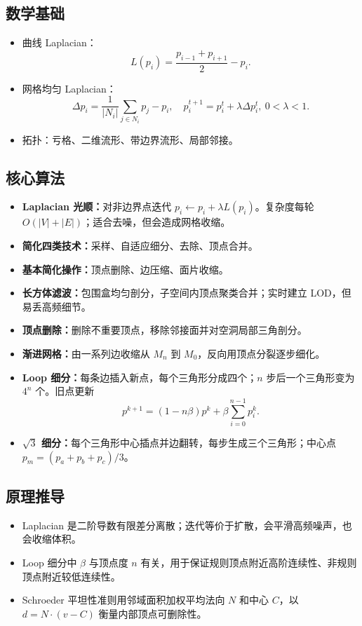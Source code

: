 \documentclass[UTF8,fontset=fandol,11pt]{ctexart}
\newcommand{\key}[1]{\textbf{#1}}
\begin{document}
\subsection{数学基础}
\begin{itemize}
  \item 曲线 Laplacian：
  \[
    L(p_i)=\frac{p_{i-1}+p_{i+1}}{2}-p_i.
  \]
  \item 网格均匀 Laplacian：
  \[
    \Delta p_i=\frac{1}{|N_i|}\sum_{j\in N_i}p_j-p_i,\quad
    p_i^{t+1}=p_i^t+\lambda\Delta p_i^t,\ 0<\lambda<1.
  \]
  \item 拓扑：亏格、二维流形、带边界流形、局部邻接。
\end{itemize}
\subsection{核心算法}
\begin{itemize}
  \item \key{Laplacian 光顺：}对非边界点迭代 $p_i\leftarrow p_i+\lambda L(p_i)$。复杂度每轮 $O(|V|+|E|)$；适合去噪，但会造成网格收缩。
  \item \key{简化四类技术：}采样、自适应细分、去除、顶点合并。
  \item \key{基本简化操作：}顶点删除、边压缩、面片收缩。
  \item \key{长方体滤波：}包围盒均匀剖分，子空间内顶点聚类合并；实时建立 LOD，但易丢高频细节。
  \item \key{顶点删除：}删除不重要顶点，移除邻接面并对空洞局部三角剖分。
  \item \key{渐进网格：}由一系列边收缩从 $M_n$ 到 $M_0$，反向用顶点分裂逐步细化。
  \item \key{Loop 细分：}每条边插入新点，每个三角形分成四个；$n$ 步后一个三角形变为 $4^n$ 个。旧点更新
  \[
    p^{k+1}=(1-n\beta)p^k+\beta\sum_{i=0}^{n-1}p_i^k.
  \]
  \item \key{$\sqrt{3}$ 细分：}每个三角形中心插点并边翻转，每步生成三个三角形；中心点 $p_m=(p_a+p_b+p_c)/3$。
\end{itemize}
\subsection{原理推导}
\begin{itemize}
  \item Laplacian 是二阶导数有限差分离散；迭代等价于扩散，会平滑高频噪声，也会收缩体积。
  \item Loop 细分中 $\beta$ 与顶点度 $n$ 有关，用于保证规则顶点附近高阶连续性、非规则顶点附近较低连续性。
  \item Schroeder 平坦性准则用邻域面积加权平均法向 $N$ 和中心 $C$，以 $d=N\cdot(v-C)$ 衡量内部顶点可删除性。
\end{itemize}
\end{document}
